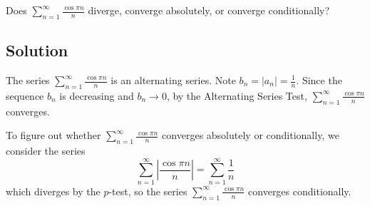 \documentclass{article}
\begin{document}
\noindent
Does $\displaystyle \sum_{n=1}^\infty \frac{\cos \pi n}{n}$
diverge, converge absolutely, or converge conditionally?

\subsection*{Solution}

The series $\displaystyle \sum_{n=1}^\infty \frac{\cos \pi n}{n}$ is an alternating series. Note $b_n = |a_n| = \frac1n$. Since the sequence $b_n$ is decreasing and $b_n \to 0$, by the Alternating Series Test, $\displaystyle \sum_{n=1}^\infty \frac{\cos \pi n}{n}$ converges.

To figure out whether $\displaystyle \sum_{n=1}^\infty \frac{\cos \pi n}{n}$ converges absolutely or conditionally, we consider the series
\[
\sum_{n=1}^\infty \left|\frac{\cos \pi n}{n}\right|
= \sum_{n=1}^\infty \frac{1}{n}
\]
which diverges by the $p$-test, so the series $\displaystyle \sum_{n=1}^\infty \frac{\cos \pi n}{n}$ converges conditionally.
\end{document}
